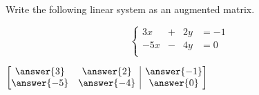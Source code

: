 \documentclass{ximera}
\makeatletter
\newenvironment{amatrix}[1]{%
	\left[\begin{array}{@{}*{#1}{c}|c@{}}
	}{%
\end{array}\right]
}
\makeatother
\begin{document}

  	
  	\begin{question}
  		Write the following linear system as an augmented matrix.
  		
  			
  			$$\left\{
  			\begin{array}{rrrl}
  			3x&+&2y &= -1\\
  			-5x& -&4y &=0\\
  			\end{array} \right.$$
  			
$  		\begin{amatrix}{2} \answer{3} & \answer{2} &\answer{-1}\\ \answer{-5} &\answer{-4} &\answer{0}\end{amatrix}$
  		
  	\end{question}
  
\end{document}
